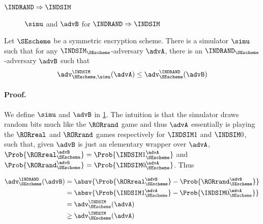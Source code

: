 \subsubsection*{$\INDRAND \Rightarrow \INDSIM$}

\begin{figure}[p]
	\centering
  \caption{$\simu$ and $\advB$ for $\INDRAND \Rightarrow \INDSIM$}
  \label{fig:rand-sim-reduct}
\end{figure} 

\begin{theorem}
Let $\SEscheme$ be a symmetric encryption scheme. There is a simulator $\simu$
such that for any $\INDSIM_{\SEscheme}$-adversary $\advA$, there is
an $\INDRAND_{\SEscheme}$-adversary $\advB$ such that
$$
\adv^{\INDSIM}_{\SEscheme,\simu}(\advA) \leq \adv^{\INDRAND}_{\SEscheme}(\advB)
$$
\label{thm:indsim-indrand-reduct}
\end{theorem}

\paragraph{Proof.}
We define $\simu$ and $\advB$ in \cref{fig:rand-sim-reduct}.
The intuition is that the simulator draws random bits much like the
$\RORrand$ game and thus $\advA$  essentially is playing the
$\RORreal$ and $\RORrand$ games respectively for
$\INDSIM1$ and $\INDSIM0$, such that, given $\advB$ is just an elementary
wrapper over $\advA$,
$\Prob{\RORreal_{\SEscheme}^{\advB}} = \Prob{\INDSIM1_{\SEscheme}^{\advA}}$
and
$\Prob{\RORrand_{\SEscheme}^{\advB}} = \Prob{\INDSIM0_{\SEscheme}^{\advA}}$.
Thus

\begin{align*}
\adv^{\INDRAND}_{\SEscheme}(\advB) &=
  \absv{\Prob{\RORreal^{\advB}_{\SEscheme}} - \Prob{\RORrand^{\advB}_{\SEscheme}}} \\
  &= \absv{\Prob{\INDSIM1^{\advA}_{\SEscheme}} - \Prob{\INDSIM0^{\advA}_{\SEscheme}}} \\
  &= \adv^{\INDSIM}_{\SEscheme}(\advA) \\
  &\geq \adv^{\INDSIM}_{\SEscheme}(\advA)
\end{align*}

